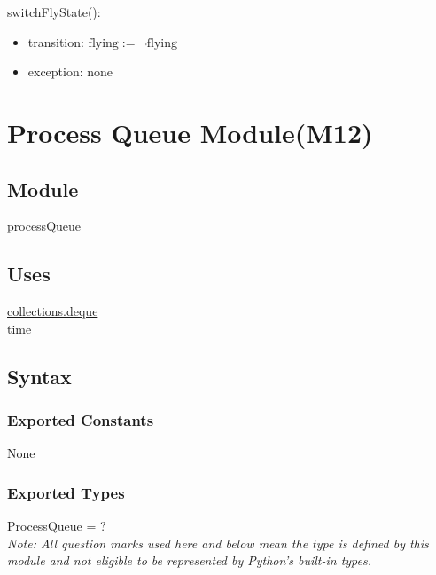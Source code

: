 \documentclass{article}
\begin{document}
\noindent switchFlyState():
\begin{itemize}
\item transition: $\text{flying} := \neg \text{flying}$
\item exception: none
\end{itemize}\vspace{6mm}

\newpage



\section {Process Queue Module(M12)}

\subsection{Module}

processQueue

\subsection {Uses}

\href{https://docs.python.org/3/library/collections.html?highlight=deque#collections.deque}{collections.deque} \\
\href{https://docs.python.org/3/library/time.html}{time}

\subsection {Syntax}

\subsubsection {Exported Constants}
None

\subsubsection {Exported Types}

ProcessQueue = ?\\
\textit{Note: All question marks used here and below mean the type is defined by this module and not eligible to be represented by Python's built-in types.}
\end{document}
